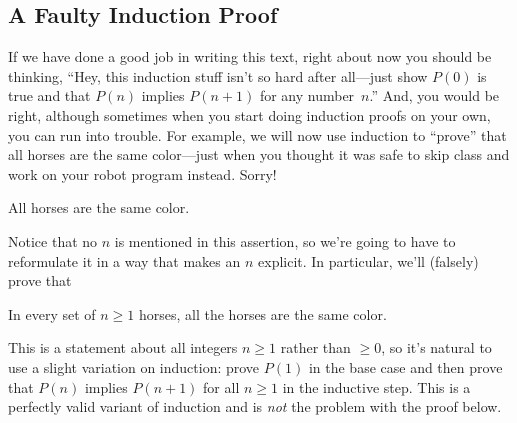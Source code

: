 \subsection{A Faulty Induction Proof}

If we have done a good job in writing this text, right about now you
should be thinking, ``Hey, this induction stuff isn't so hard after
all---just show $P(0)$ is true and that $P(n)$ implies $P(n+1)$ for
any number~$n$.''  And, you would be right, although sometimes when
you start doing induction proofs on your own, you can run into
trouble.  For example, we will now use induction to ``prove'' that all
horses are the same color---just when you thought it was safe to skip
class and work on your robot program instead.  Sorry!

\begin{falsethm*}
All horses are the same color.
\end{falsethm*}

Notice that no $n$ is mentioned in this assertion, so we're going to have
to reformulate it in a way that makes an $n$ explicit.  In particular,
we'll (falsely) prove that

\begin{falsethm}\label{horses}
In every set of $n \geq 1$ horses, all the horses are the same color.
\end{falsethm}

This is a statement about all integers $n \geq 1$ rather than $\geq
0$, so it's natural to use a slight variation on induction: prove
$P(1)$ in the base case and then prove that $P(n)$ implies $P(n+1)$
for all $n \geq 1$ in the inductive step.  This is a perfectly valid
variant of induction and is \emph{not} the problem with the proof
below.

